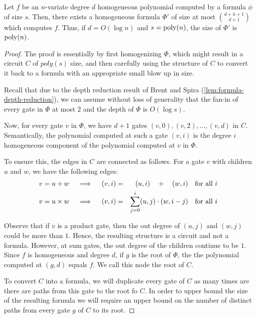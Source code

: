 \begin{lemma}\label{lem:formula homogenization}
Let $f$ be an $n$-variate degree $d$ homogeneous polynomial computed by a formula $\phi$ of size $s$. Then, there exists a homogeneous formula $\Phi'$ of size at most ${d + h + 1\choose d+1}$ which computes $f$. Thus, if $d = O(\log n)$ and $s = \operatorname{poly}(n)$, the size of $\Phi'$ is $\operatorname{poly}(n)$. 
\end{lemma}
\begin{proof}
The proof is essentially by first homogenizing $\Phi$, which might result in a circuit $C$ of $poly(s)$ size, and then carefully using the structure of $C$ to convert it back to a formula with an appropriate small blow up in size. 

Recall that due to the depth reduction result of Brent and Spira (\autoref{lem:formula-depth-reduction}), we can assume without loss of generality that the fan-in of every gate in $\Phi$ at most $2$ and the depth of $\Phi$ is $O(\log s)$. 

Now, for every gate $v$ in $\Phi$, we have $d+1$ gates $(v, 0), (v, 2), \ldots, (v, d)$ in $C$. Semantically,  the polynomial computed at such a gate $(v, i)$ is the degree $i$ homogeneous component of the polynomial computed at $v$ in $\Phi$. 

To ensure this, the edges in $C$ are connected as follows. For a gate $v$ with children $u$ and $w$, we have the following edges:
\begin{eqnarray*}
\text{$v = u + w$}\quad\implies\quad (v, i) &=& (u, i) \quad + \quad (w,i)\quad\text{for all $i$}\\
\text{$v = u \times w$}\quad\implies\quad (v, i) &=& \sum_{j=0}^i (u,j)\cdot (w, {i-j}) \quad\text{for all $i$}
\end{eqnarray*}
 
Observe that if $v$ is a product gate, then the out degree of $(u, j)$ and $(w, j)$ could be more than $1$. Hence, the resulting structure is a circuit and not a formula. However, at sum gates, the out degree of the children continue to be $1$. Since $f$ is homogeneous and degree $d$, if $g$ is the root of $\Phi$, the the polynomial computed at $(g,d)$ equals $f$. We call this node the root of $C$.

To convert $C$ into a formula, we will duplicate every gate of $C$ as many times are there are paths from this gate to the root fo $C$. 
In order to upper bound the size of the resulting formula we will require an upper bound on the number of distinct paths from every gate $g$ of $C$ to its root. 


\end{proof}
